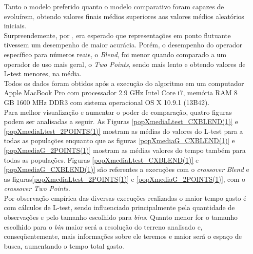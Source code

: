 Tanto o modelo preferido quanto o modelo comparativo foram capazes de evoluírem, obtendo valores finais médios superiores aos valores médios aleatórios iniciais.\\

Surpreendemente, por \citep{janikow1991experimental}, era esperado que representações em ponto flutuante tivessem um desempenho de maior acurácia. Porém, o desempenho do operador específico para números reais, o {\it Blend}, foi menor quando comparado a um operador de uso mais geral, o {\it Two Points}, sendo mais lento e obtendo valores de L-test menores, na média.	\\
	
Todos os dados foram obtidos após a execução do algoritmo em um computador Apple MacBook Pro com processador 2.9 GHz Intel Core i7, memória RAM 8 GB 1600 MHz DDR3 com sistema operacional OS X 10.9.1 (13B42).\\



Para melhor visualização e aumentar o poder de comparação, quatro figuras podem ser analisadas a seguir. As Figuras \ref{popXmediaLtest_CXBLEND(1)} e \ref{popXmediaLtest_2POINTS(1)} mostram as médias do valores do L-test para a todas as populações enquanto que as figuras \ref{popXmediaG_CXBLEND(1)} e \ref{popXmediaG_2POINTS(1)} mostram as médias valores do tempo também para todas as populações. Figuras \ref{popXmediaLtest_CXBLEND(1)} e \ref{popXmediaG_CXBLEND(1)} são referentes a execuções com o {\it crossover Blend} e as figuras\ref{popXmediaLtest_2POINTS(1)} e \ref{popXmediaG_2POINTS(1)}, com o {\it crossover Two Points}. \\


Por observação empírica das diversas execuções realizadas o maior tempo gasto é com cálculos de L-test, sendo influenciado principalmente pela quantidade de observações e pelo tamanho escolhido para {\it bins}. Quanto menor for o tamanho escolhido para o {\it bin} maior será a resolução do terreno analisado e, conseqüentemente, mais informações sobre ele teremos e maior será o espaço de busca, aumentando o tempo total gasto.\\

